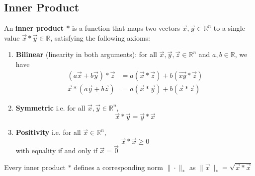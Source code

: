 \documentclass[11pt]{elegantbook}
\begin{document}
\subsection{ Inner Product}
\begin{definition}\end{definition}
An \textbf{inner product $*$} is a function that maps two vectors $\vec{x},\vec{y}\in \mathbb{R}^n$ to a single value $\vec{x}*\vec{y}\in \mathbb{R}$, satisfying the following axioms:
\begin{enumerate}
    \item \textbf{Bilinear} (linearity in both arguments): for all $\vec{x},\vec{y},\vec{z}\in \mathbb{R}^n$ and $a,b\in \mathbb{R}$, we have
    \begin{equation}
        \begin{aligned}
            (a \vec{x}+ b\vec{y})*\vec{z}&=a(\vec{x}*\vec{z})+b(\vec{xy}*\vec{z})\\
            \vec{x}*(a \vec{y}+b \vec{z})&=a(\vec{x}* \vec{y})+ b(\vec{x}* \vec{z})
        \end{aligned}
        \nonumber
    \end{equation}
    \item \textbf{Symmetric} i.e. for all $\vec{x},\vec{y}\in \mathbb{R}^n$, $$\vec{x}* \vec{y}=\vec{y}* \vec{x}$$
    \item \textbf{Positivity} i.e. for all $\vec{x}\in \mathbb{R}^n$, $$\vec{x}* \vec{x}\geq 0$$ with equality if and only if $\vec{x}=\vec{0}$
\end{enumerate}

\begin{definition}
    Every inner product $*$ defines a corresponding norm $\|\cdot\|_*$ as $\|\vec{x}\|_*=\sqrt{\vec{x}*\vec{x}}$
\end{definition}
\end{document}
